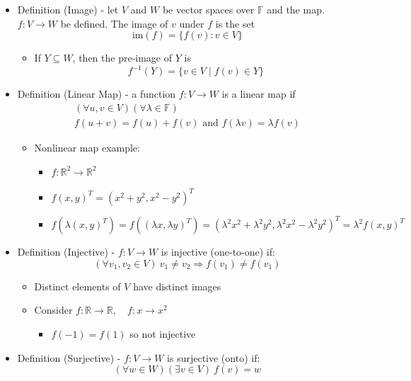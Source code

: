 \documentclass{article}
\begin{document}
\begin{itemize}
    \item Definition (Image) - let $V$ and $W$ be vector spaces over $\mathbb{F}$ and the map. $f : V \rightarrow W$ be defined. The image of $v$ under $f$ is the set
    \[
    \text{im}(f) = \{ f(v) : v \in V \}
    \]
    \begin{itemize}
        \item If $Y \subseteq W$, then the pre-image of $Y$ is
        \[
        f^{-1}(Y) = \{ v \in V \mid f(v) \in Y \}
        \]
    \end{itemize}
    \item Definition (Linear Map) - a function $f : V \rightarrow W$ is a linear map if
    \begin{gather*}
        (\forall u,v \in V)(\forall \lambda \in \mathbb{F}) \\
        f(u+v)=f(u)+f(v) \text{ and } f(\lambda v) = \lambda f(v)
    \end{gather*}
    \begin{itemize}
        \item Nonlinear map example:
        \begin{itemize}
            \item $f : \mathbb{R}^2 \rightarrow \mathbb{R}^2$
            \item $f(x,y)^T = (x^2+y^2, x^2-y^2)^T$
            \item $f(\lambda(x,y)^T) = f((\lambda x, \lambda y)^T) = (\lambda^2x^2+\lambda^2y^2,\lambda^2x^2-\lambda^2y^2)^T = \lambda^2 f(x,y)^T$
        \end{itemize}
    \end{itemize}
    \item Definition (Injective) - $f:V \rightarrow W$ is injective (one-to-one) if:
    \[
    (\forall v_1,v_2 \in V) \ v_1 \neq v_2 \Rightarrow f(v_1) \neq f(v_1)
    \]
    \begin{itemize}
        \item Distinct elements of $V$ have distinct images
        \item Consider $f : \mathbb{R} \rightarrow \mathbb{R}, \quad f : x \rightarrow x^2$
        \begin{itemize}
            \item $f(-1)=f(1)$ so not injective
        \end{itemize}
    \end{itemize}
    \item Definition (Surjective) - $f : V \rightarrow W$ is surjective (onto) if:
    \[
    (\forall w \in W)(\exists v \in V) \ f(v) = w
\]
\end{itemize}
\end{document}
